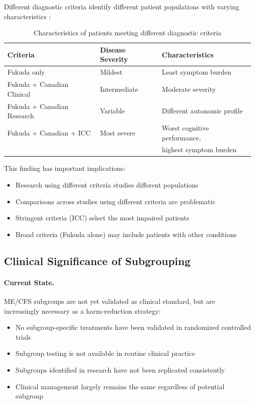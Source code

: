 Different diagnostic criteria identify different patient populations with varying characteristics \cite{Brown2013phenotypes}:

\begin{table}[htbp]
\centering
\caption{Characteristics of patients meeting different diagnostic criteria}
\label{tab:criteria-phenotypes}
\begin{tabular}{lll}
\toprule
\textbf{Criteria} & \textbf{Disease Severity} & \textbf{Characteristics} \\
\midrule
Fukuda only & Mildest & Least symptom burden \\
Fukuda + Canadian Clinical & Intermediate & Moderate severity \\
Fukuda + Canadian Research & Variable & Different autonomic profile \\
Fukuda + Canadian + ICC & Most severe & Worst cognitive performance, \\
                        &             & highest symptom burden \\
\bottomrule
\end{tabular}
\end{table}

This finding has important implications:
\begin{itemize}
    \item Research using different criteria studies different populations
    \item Comparisons across studies using different criteria are problematic
    \item Stringent criteria (ICC) select the most impaired patients
    \item Broad criteria (Fukuda alone) may include patients with other conditions
\end{itemize}

\subsection{Clinical Significance of Subgrouping}

\paragraph{Current State.}
ME/CFS subgroups are not yet validated as clinical standard, but are increasingly necessary as a harm-reduction strategy:
\begin{itemize}
    \item No subgroup-specific treatments have been validated in randomized controlled trials
    \item Subgroup testing is not available in routine clinical practice
    \item Subgroups identified in research have not been replicated consistently
    \item Clinical management largely remains the same regardless of potential subgroup
\end{itemize}

